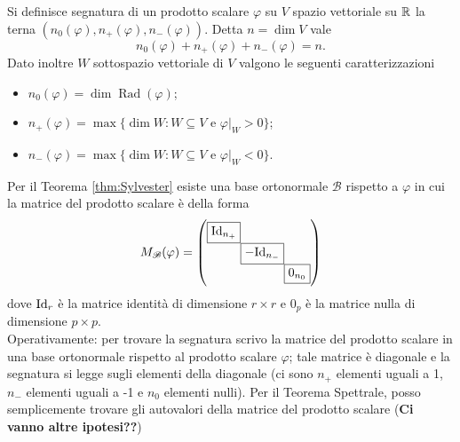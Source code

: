 \begin{definition}
	Si definisce segnatura di un prodotto scalare $ \varphi $ su $ V $ spazio vettoriale su $ \mathbb{R} $ la terna $ (n_0 (\varphi), n_{+} (\varphi), n_{-} (\varphi)) $. Detta $ n = \dim{V} $ vale \[n_0 (\varphi) + n_{+} (\varphi) + n_{-} (\varphi) = n.\] Dato inoltre $ W $ sottospazio vettoriale di $ V $ valgono le seguenti caratterizzazioni
	\begin{itemize}
		\item $ n_0 (\varphi) = \dim{\operatorname{Rad}{(\varphi)}} $;
		\item $ n_{+} (\varphi) = \max{\{\dim{W} : W \subseteq V \text{ e } \varphi|_{W} > 0\}} $;
		\item $ n_{-} (\varphi) = \max{\{\dim{W} : W \subseteq V \text{ e } \varphi|_{W} < 0\}} $.
	\end{itemize}
	Per il Teorema \ref{thm:Sylvester} esiste una base ortonormale $ \mathscr{B} $ rispetto a $ \varphi $ in cui la matrice del prodotto scalare è della forma
	\[M_{\mathscr{B}}(\varphi) =
	\setlength{\arraycolsep}{0pt}
	\begin{pmatrix}
	\fbox{$ \Id_{n_{+}} $} & & \\
	& \fbox{$ -\Id_{n_{-}} $} & \\
	& & \fbox{$ 0_{n_{0}} $}
	\end{pmatrix} \]
	dove $ \mathrm{Id}_{r} $ è la matrice identità di dimensione $ r \times r $ e $ 0_p $ è la matrice nulla di dimensione $ p \times p $. \\
	Operativamente: per trovare la segnatura scrivo la matrice del prodotto scalare in una base ortonormale rispetto al prodotto scalare $ \varphi $; tale matrice è diagonale e la segnatura si legge sugli elementi della diagonale (ci sono $ n_{+} $ elementi uguali a 1, $ n_{-} $ elementi uguali a -1 e $ n_{0} $ elementi nulli). Per il Teorema Spettrale, posso semplicemente trovare gli autovalori della matrice del prodotto scalare (\textbf{Ci vanno altre ipotesi??})
\end{definition}
